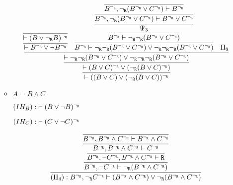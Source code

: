 \begin{enumerate}[(i)]
\begin{itemize}
            $$
            \infer{
                \vdash ((B \vee C) \vee (\ngr (B \vee C))^\ngr
            }{
            \infer{
                \vdash (B \vee C)^\ngr \vee (\ngr (B \vee C)^\ngr)
            }{
                \infer{
                    \vdash \ngr\ngr(B^\ngr \vee C^\ngr) \vee \ngr\ngr\ngr (B^\ngr \vee C^\ngr)
                }{
                    \infer{
                        \vdash B^\ngr \vee \neg B^\ngr
                    }{
                        \infer{
                            \vdash (B \vee \ngr B)^\ngr
                        }{
                        }
                    }&
                    \infer{
                        B^\ngr \vdash \ngr\ngr(B^\ngr \vee C^\ngr) \vee \ngr\ngr\ngr (B^\ngr \vee C^\ngr)
                    }{
                        \infer{
                            B^\ngr \vdash \ngr\ngr(B^\ngr \vee C^\ngr)
                        }{
                            \infer{
                                \Psi_3
                            }{
                                \infer{
                                    B^\ngr, \ngr(B^\ngr \vee C^\ngr) \vdash B^\ngr \vee C^\ngr
                                }{
                                    \infer{
                                        B^\ngr, \ngr(B^\ngr \vee C^\ngr) \vdash B^\ngr
                                    }{
                                    }
                                }
                            }
                        }
                    }&
                    \Pi_9
                }
            }
            }
            $$

        \item $A = B \wedge C$
        
            $(IH_B) : \; \vdash (B \vee \neg B)^{\neg_{\texttt{R}}}$
            
            $(IH_C) : \; \vdash (C \vee \neg C)^{\neg_{\texttt{R}}}$


            $$
                \infer{
                    (\Pi_4) : B^\ngr, \ngr C^\ngr \vdash (B^\ngr \wedge C^\ngr) \vee \ngr(B^\ngr \wedge C^\ngr)
                }{
                    \infer{
                        B^\ngr, \neg C^\ngr \vdash \ngr(B^\ngr \wedge C^\ngr)
                    }{
                        \infer{
                            B^\ngr, \neg C^\ngr, B^\ngr \wedge C^\ngr \vdash \R
                        }{
                            \infer{
                                B^\ngr, B^\ngr \wedge C^\ngr \vdash C^\ngr
                            }{
                                \infer{
                                    B^\ngr, B^\ngr \wedge C^\ngr \vdash B^\ngr \wedge C^\ngr
                                }{
                                }
                            }
                        }
                    }
                }
            $$



\end{itemize}
\end{enumerate}

